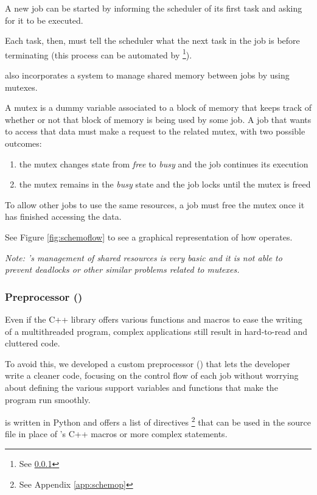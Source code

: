   A new job can be started by informing the scheduler of its first
  task and asking for it to be executed.

  Each task, then, must tell the scheduler what the next task in the
  job is before terminating (this process can be automated by
  \footnote{See \ref{sssec:schemop}}).

  \ScheMo{} also incorporates a system to manage shared memory between
  jobs by using mutexes.

  A mutex is a dummy variable associated to a block of memory that
  keeps track of whether or not that block of memory is being used by
  some job. A job that wants to access that data must make a request
  to the related mutex, with two possible outcomes:
  \begin{enumerate}
    \item the mutex changes state from \textit{free} to
      \textit{busy} and the job continues its execution
    \item the mutex remains in the \textit{busy} state and the job
      locks until the mutex is freed
  \end{enumerate}

  To allow other jobs to use the same resources, a job must free the
  mutex once it has finished accessing the data.

  See Figure \ref{fig:schemoflow} to see a graphical representation
  of how \ScheMo{} operates.

  \textit{Note: \ScheMo{}'s management of shared resources is very
  basic and it is not able to prevent deadlocks or other similar
  problems related to mutexes.}
 
\subsubsection{\ScheMo{} Preprocessor ()}
\label{sssec:schemop}
  Even if the C++ library offers various functions and macros to
  ease the writing of a multithreaded program, complex applications
  still result in hard-to-read and cluttered code.

  To avoid this, we developed a custom preprocessor
  () that lets the developer write a cleaner code,
  focusing on the control flow of each job without worrying about
  defining the various support variables and functions that make the
  program run smoothly.

   is written in Python and offers a list of directives%
  \footnote{See Appendix \ref{app:schemop}} that can be used in the
  source file in place of \ScheMo{}'s C++ macros or more complex statements.
  
